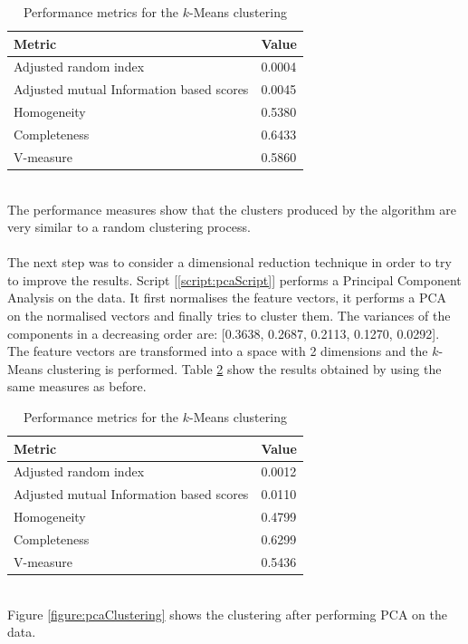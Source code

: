 \documentclass[11pt, oneside]{article}   	%
\begin{document}
\begin{table}[h]
	\centering
	\begin{tabular}{| l | l |}
		\hline
		 \textbf{Metric} & \textbf{Value} \\ \hline
		 Adjusted random index & 0.0004\\ \hline
		 Adjusted mutual Information based scores & 0.0045 \\ \hline
		 Homogeneity & 0.5380 \\ \hline
		 Completeness & 0.6433 \\ \hline
		 V-measure & 0.5860 \\ \hline
	\end{tabular}
	\caption{Performance metrics for the $k$-Means clustering}
	\label{table:kMeansMetrics}
\end{table}
\noindent \\The performance measures show that the clusters produced by the algorithm are very similar to a random clustering process.\\\\
The next step was to consider a dimensional reduction technique in order to try to improve the results. Script [\ref{script:pcaScript}] performs a Principal Component Analysis on the data. It first normalises the feature vectors, it performs a PCA on the normalised vectors and finally tries to cluster them. The variances of the components in a decreasing order are: [0.3638, 0.2687, 0.2113, 0.1270,  0.0292]. The feature vectors are transformed into a space with 2 dimensions and the $k$-Means clustering is performed. Table \ref{table:kMeansMetricsPca} show the results obtained by using the same measures as before.
\begin{table}[h!]
	\centering
	\begin{tabular}{| l | l |}
		\hline
		 \textbf{Metric} & \textbf{Value} \\ \hline
		 Adjusted random index & 0.0012\\ \hline
		 Adjusted mutual Information based scores & 0.0110 \\ \hline
		 Homogeneity & 0.4799 \\ \hline
		 Completeness & 0.6299 \\ \hline
		 V-measure & 0.5436 \\ \hline
	\end{tabular}
	\caption{Performance metrics for the $k$-Means clustering}
	\label{table:kMeansMetricsPca}
\end{table}
\\Figure \ref{figure:pcaClustering} shows the clustering after performing PCA on the data.
\end{document}
